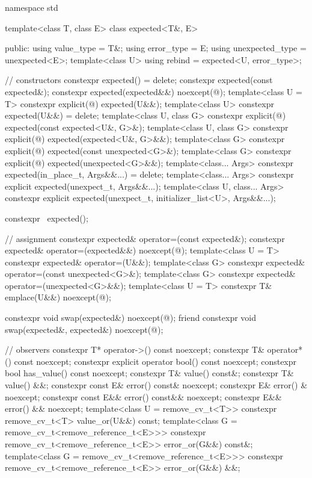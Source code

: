 \documentclass[a4paper,10pt,oneside,openany,final,article]{memoir}
\begin{document}
\begin{codeblock}
namespace std {
template<class T, class E>
class expected<T&, E> {
  public:
    using value_type      = T&;
    using error_type      = E;
    using unexpected_type = unexpected<E>;
    template<class U>
    using rebind = expected<U, error_type>;

    // constructors
    constexpr expected() = delete;
    constexpr expected(const expected&);
    constexpr expected(expected&&) noexcept(@\seebelow@);
    template<class U = T>
    constexpr explicit(@\seebelow@) expected(U&&);
    template<class U>
    constexpr expected(U&&) = delete;
    template<class U, class G>
    constexpr explicit(@\seebelow@) expected(const expected<U&, G>&);
    template<class U, class G>
    constexpr explicit(@\seebelow@) expected(expected<U&, G>&&);
    template<class G>
    constexpr explicit(@\seebelow@) expected(const unexpected<G>&);
    template<class G>
    constexpr explicit(@\seebelow@) expected(unexpected<G>&&);
    template<class... Args>
    constexpr expected(in_place_t, Args&&...) = delete;
    template<class... Args>
    constexpr explicit expected(unexpect_t, Args&&...);
    template<class U, class... Args>
    constexpr explicit expected(unexpect_t, initializer_list<U>, Args&&...);

    constexpr ~expected();

    // assignment
    constexpr expected& operator=(const expected&);
    constexpr expected& operator=(expected&&) noexcept(@\seebelow@);
    template<class U = T>
    constexpr expected& operator=(U&&);
    template<class G>
    constexpr expected& operator=(const unexpected<G>&);
    template<class G>
    constexpr expected& operator=(unexpected<G>&&);
    template<class U = T>
    constexpr T& emplace(U&&) noexcept(@\seebelow@);

    constexpr void        swap(expected&) noexcept(@\seebelow@);
    friend constexpr void swap(expected&, expected&) noexcept(@\seebelow@);

    // observers
    constexpr T*        operator->() const noexcept;
    constexpr T&        operator*() const noexcept;
    constexpr explicit  operator bool() const noexcept;
    constexpr bool      has_value() const noexcept;
    constexpr T&        value() const&;
    constexpr T&        value() &&;
    constexpr const E&  error() const& noexcept;
    constexpr E&        error() & noexcept;
    constexpr const E&& error() const&& noexcept;
    constexpr E&&       error() && noexcept;
    template<class U = remove_cv_t<T>>
    constexpr remove_cv_t<T> value_or(U&&) const;
    template<class G = remove_cv_t<remove_reference_t<E>>>
    constexpr remove_cv_t<remove_reference_t<E>> error_or(G&&) const&;
    template<class G = remove_cv_t<remove_reference_t<E>>>
    constexpr remove_cv_t<remove_reference_t<E>> error_or(G&&) &&;

}}
\end{codeblock}
\end{document}
